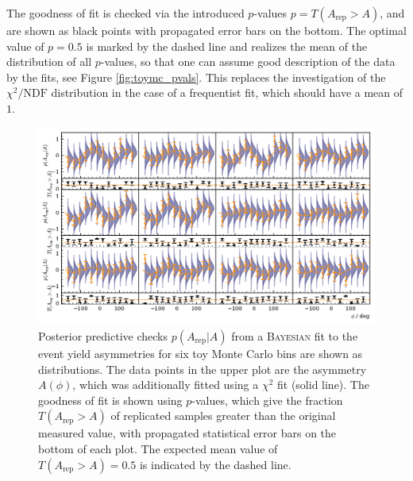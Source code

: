 The goodness of fit is checked via the introduced $p$-values $p=T(A_\text{rep}>A)$, and are shown as black points with propagated error bars on the bottom. The optimal value of $p=0.5$ is marked by the dashed line and realizes the mean of the distribution of all $p$-values, so that one can assume good description of the data by the fits, see Figure \ref{fig:toymc_pvals}. This replaces the investigation of the $\chi^2/\text{NDF}$ distribution in the case of a frequentist fit, which should have a mean of $1$.  
\begin{landscape}
	\begin{figure}[htbp]
		\centering
		\includegraphics[width=\linewidth,height=.8\textwidth]{../bayes/toyMC/plots/toyMC_ppd_checks.pdf}
		\caption{Posterior predictive checks $p\left(A_\text{rep}\big|A\right)$ from a \textsc{Bayesian} fit to the event yield asymmetries for six toy Monte Carlo bins are shown as distributions. The data points in the upper plot are the asymmetry $A\left(\phi\right)$, which was additionally fitted using a $\chi^2$ fit (solid line). The goodness of fit is shown using $p$-values, which give the fraction $T\left(A_\text{rep}>A\right)$ of replicated samples greater than the original measured value, with propagated statistical error bars on the bottom of each plot. The expected mean value of $T\left(A_\text{rep}>A\right)=0.5$ is indicated by the dashed line. }
		\label{fig:toymc_asym}
	\end{figure}
\end{landscape}



